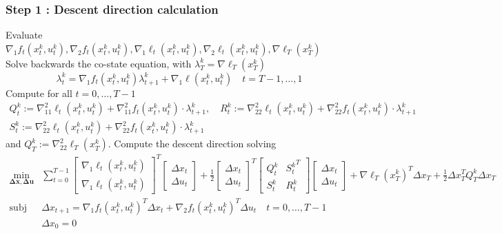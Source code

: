 \documentclass[openany]{book}
\theoremstyle{definition}
\theoremstyle{remark}
\begin{document}
\subsubsection{Step 1 : Descent direction calculation}
Evaluate $\nabla_1f_t(x_t^k,u_t^k),\nabla_2f_t(x_t^k,u_t^k),\nabla_1\ell_t(x_t^k,u_t^k),\nabla_2\ell_t(x_t^k,u_t^k),\nabla\ell_T(x_T^k)$\\ 
Solve backwards the co-state equation, with $\lambda_T^k = \nabla\ell_T(x_T^k)$
\[
    \lambda_t^k = \nabla_1f_t(x_t^k,u_t^k)\lambda_{t+1}^k + \nabla_1\ell(x_t^k,u_t^k) \quad t = T-1,\dots,1
\]
Compute for all $t= 0,\dots,T-1$
\begin{gather*}
    Q_t^k := \nabla_{11}^2\ell_t(x_t^k,u_t^k) + \nabla^2_{11}f_t(x_t^k,u_t^k)\cdot \lambda_{t+1}^k, \quad R_t^k := \nabla_{22}^2\ell_t(x_t^k,u_t^k) + \nabla^2_{22}f_t(x_t^k,u_t^k)\cdot \lambda_{t+1}^k\\
    S_t^k := \nabla_{22}^2\ell_t(x_t^k,u_t^k) + \nabla^2_{22}f_t(x_t^k,u_t^k)\cdot \lambda_{t+1}^k
\end{gather*}
and $Q_T^k := \nabla_{22}^2 \ell_T(x_T^k)$. Compute the descent direction solving 
\begin{align*}
    \min_{\mathbf{\Delta x, \Delta u}}  &\displaystyle\sum_{t=0}^{T-1}\begin{bmatrix}
        \nabla_1\ell_t(x_t^k,u_t^k)\\
        \nabla_1\ell_t(x_t^k,u_t^k)
    \end{bmatrix}^T \begin{bmatrix}
        \Delta x_t \\ \Delta u_t
    \end{bmatrix} + \displaystyle\frac{1}{2}\begin{bmatrix}
        \Delta x_t \\ \Delta u_t
    \end{bmatrix}^T \begin{bmatrix}
        Q_t^k & {S_t^k}^T \\ S_t^k & R_t^k
    \end{bmatrix}\begin{bmatrix}
        \Delta x_t \\ \Delta u_t
    \end{bmatrix} 
     + \nabla\ell_T(x_T^k)^T\Delta x_T + \displaystyle\frac{1}{2}\Delta x_T^TQ_T^k\Delta x_T\\
    \text{subj to } & \Delta x_{t+1} = \nabla_1f_t(x_t^k,u_t^k)^T\Delta x_t + \nabla_2f_t(x_t^k,u_t^k)^T\Delta u_t \quad t=0,\dots,T-1 \\ 
    & \Delta x_0 = 0
\end{align*}
\end{document}
